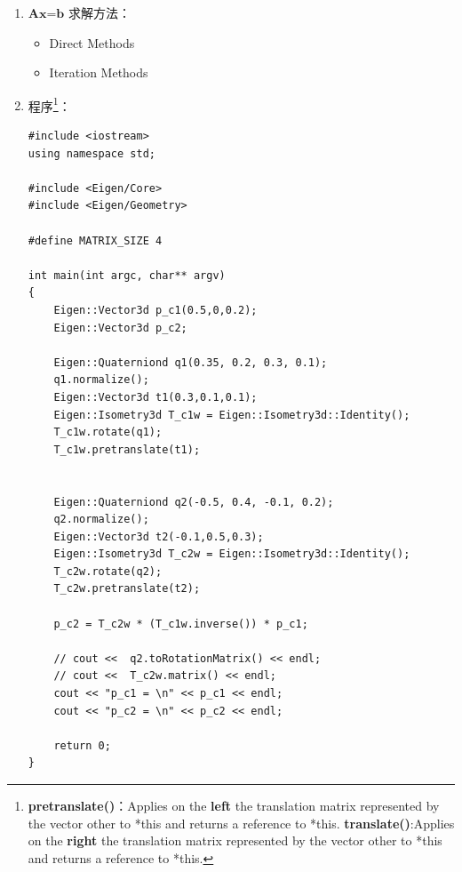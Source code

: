 \documentclass[12pt,a4paper]{ctexart}
\begin{document}
\begin{enumerate}
\begin{lstlisting}
#include <Eigen/Core>
#define MATRIX_SIZE 4

int main(int argc, char** argv)
{
	Eigen::Matrix<double, MATRIX_SIZE, MATRIX_SIZE> matrix_NN;
	matrix_NN = Eigen::MatrixXd::Random(MATRIX_SIZE, MATRIX_SIZE);
	cout << "Original Matrix = \n" << matrix_NN << endl;
	
	Eigen::Matrix3d matrix_I = Eigen::Matrix3d::Identity();
	cout << "TopLeft33 of the Matrix = \n" << matrix_NN.topLeftCorner(3,3) << endl;
	
	matrix_NN.topLeftCorner(3, 3) = matrix_I;
	cout << "Final Matrix = \n" << matrix_NN << endl;
	
	return 0;
}
\end{lstlisting}
		\item $ \textbf{Ax=b} $ 求解方法：
		\begin{itemize}
			\item Direct Methods
			\item Iteration Methods
		\end{itemize}
		\item 程序\footnote{\textbf{pretranslate()}：Applies on the \textbf{left} the translation matrix represented by the vector other to *this and returns a reference to *this. \textbf{translate()}:Applies on the \textbf{right} the translation matrix represented by the vector other to *this and returns a reference to *this.}：
		\lstset{language=C++}
\begin{lstlisting}
#include <iostream>
using namespace std;

#include <Eigen/Core>
#include <Eigen/Geometry>

#define MATRIX_SIZE 4

int main(int argc, char** argv)
{
	Eigen::Vector3d p_c1(0.5,0,0.2);
	Eigen::Vector3d p_c2;
	
	Eigen::Quaterniond q1(0.35, 0.2, 0.3, 0.1);
	q1.normalize();
	Eigen::Vector3d t1(0.3,0.1,0.1);
	Eigen::Isometry3d T_c1w = Eigen::Isometry3d::Identity();
	T_c1w.rotate(q1);
	T_c1w.pretranslate(t1);
	
	
	Eigen::Quaterniond q2(-0.5, 0.4, -0.1, 0.2);
	q2.normalize();
	Eigen::Vector3d t2(-0.1,0.5,0.3);
	Eigen::Isometry3d T_c2w = Eigen::Isometry3d::Identity();
	T_c2w.rotate(q2);
	T_c2w.pretranslate(t2);
	
	p_c2 = T_c2w * (T_c1w.inverse()) * p_c1;
	
	// cout <<  q2.toRotationMatrix() << endl;
	// cout <<  T_c2w.matrix() << endl;
	cout << "p_c1 = \n" << p_c1 << endl;
	cout << "p_c2 = \n" << p_c2 << endl;
	
	return 0;
}
\end{lstlisting}	
\end{enumerate}
\end{document}
